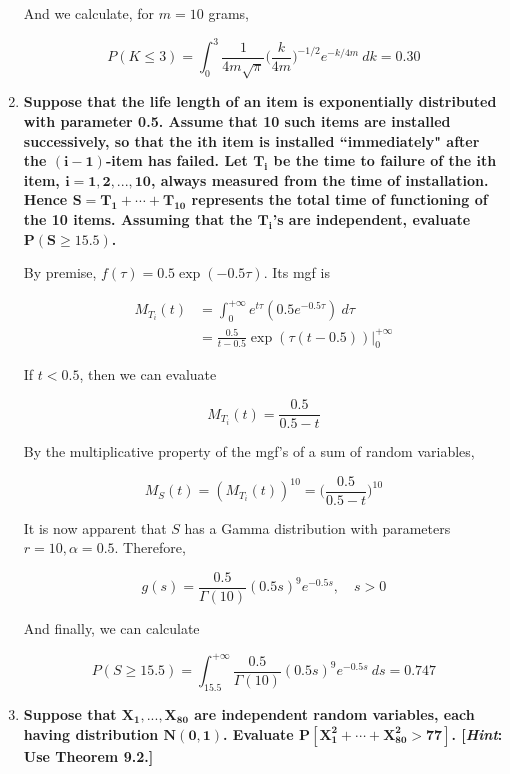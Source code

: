 \documentclass[10pt, oneside]{article}   	%
\theoremstyle{definition}
\begin{document}
\begin{enumerate}[label=10.\arabic*]
And we calculate, for $m = 10$ grams,

\[ P(K \leq 3) = \int^3_0 \frac{1}{4m \sqrt{\pi}} \bigg( \frac{k}{4m} \bigg)^{-1/2} e^{-k/4m} \ dk = \boxed{0.30} \]

\item  \begin{tcolorbox}[
  colback=Cerulean!5!white,
  colframe=Cerulean!75!black]
\textbf{Suppose that the life length of an item is exponentially distributed with parameter 0.5. Assume that 10 such items are installed successively, so that the $\bm{i}$th item is installed ``immediately" after the $\bm{(i-1)}$-item has failed. Let $\bm{T_i}$ be the time to failure of the $\bm{i}$th item, $\bm{i = 1, 2, ..., 10}$, always measured from the time of installation. Hence $\bm{S = T_1 + \cdots + T_{10}}$ represents the total time of functioning of the 10 items. Assuming that the $\bm{T_i}$'s are independent, evaluate $\bm{P(S \geq 15.5)}$.}
\end{tcolorbox}

By premise, $f(\tau) = 0.5 \exp (-0.5 \tau)$. Its mgf is

\begin{align*}
M_{T_i}(t) &= \int^{+\infty}_0 e^{t\tau} (0.5 e^{-0.5 \tau}) \ d\tau \\
&= \frac{0.5}{t - 0.5} \exp(\tau(t-0.5)) \bigg|^{+\infty}_0
\end{align*}

If $t < 0.5$, then we can evaluate

\[ M_{T_i} (t) = \frac{0.5}{0.5-t} \]

By the multiplicative property of the mgf's of a sum of random variables,

\[ M_S(t) = (M_{T_i}(t))^{10} = \bigg( \frac{0.5}{0.5-t} \bigg)^{10} \]

It is now apparent that $S$ has a Gamma distribution with parameters $r=10, \alpha = 0.5$. Therefore,

\[ g(s) = \frac{0.5}{\Gamma(10)} (0.5 s)^9 e^{-0.5s}, \quad s > 0 \]

And finally, we can calculate

\[ P(S \geq 15.5) = \int^{+\infty}_{15.5} \frac{0.5}{\Gamma(10)} (0.5 s)^9 e^{-0.5s} \ ds = \boxed{0.747} \]

\item  \begin{tcolorbox}[
  colback=Cerulean!5!white,
  colframe=Cerulean!75!black]
\textbf{Suppose that $\bm{X_1, ..., X_{80}}$ are independent random variables, each having distribution $\bm{N(0,1)}$. Evaluate $\bm{P[X^2_1 + \cdots + X^2_{80} > 77]}$. [\textit{Hint}: Use Theorem 9.2.]}
\end{tcolorbox}


\end{enumerate}
\end{document}
